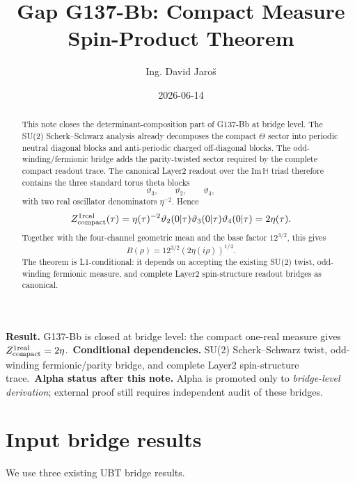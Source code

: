 \documentclass[12pt,a4paper]{article}
\title{Gap G137-Bb: Compact Measure Spin-Product Theorem}
\author{Ing. David Jaroš}
\date{2026-06-14}
\begin{document}
\maketitle

\begin{abstract}
This note closes the determinant-composition part of G137-Bb at bridge level.
The SU(2) Scherk--Schwarz analysis already decomposes the compact $\Theta$
sector into periodic neutral diagonal blocks and anti-periodic charged
off-diagonal blocks.  The odd-winding/fermionic bridge adds the parity-twisted
sector required by the complete compact readout trace.  The canonical Layer2
readout over the $\mathrm{Im}\,\mathbb H$ triad therefore contains the three
standard torus theta blocks
\[
  \vartheta_3,
  \qquad
  \vartheta_2,
  \qquad
  \vartheta_4,
\]
with two real oscillator denominators $\eta^{-2}$.  Hence
\[
  Z_{\rm compact}^{1\rm real}(\tau)
  =\eta(\tau)^{-2}\vartheta_2(0|\tau)\vartheta_3(0|\tau)\vartheta_4(0|\tau)
  =2\eta(\tau).
\]
Together with the four-channel geometric mean and the base factor
$12^{3/2}$, this gives
\[
  B(\rho)=12^{3/2}(2\eta(i\rho))^{1/4}.
\]
The theorem is L1-conditional: it depends on accepting the existing SU(2) twist,
odd-winding fermionic measure, and complete Layer2 spin-structure readout
bridges as canonical.
\end{abstract}

\begin{statusbox}
\textbf{Result.}  G137-Bb is closed at bridge level: the compact one-real
measure gives $Z_{\rm compact}^{1\rm real}=2\eta$.\
\textbf{Conditional dependencies.} SU(2) Scherk--Schwarz twist, odd-winding
fermionic/parity bridge, and complete Layer2 spin-structure trace.\
\textbf{Alpha status after this note.} Alpha is promoted only to
\emph{bridge-level derivation}; external proof still requires independent audit
of these bridges.
\end{statusbox}

\section{Input bridge results}

We use three existing UBT bridge results.
\end{document}
